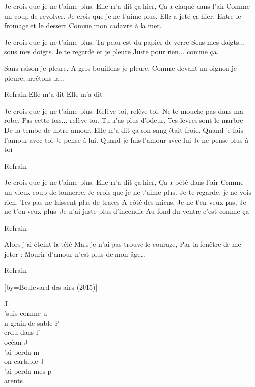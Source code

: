 \beginverse
Je crois que je ne t'aime plus.
Elle m'a dit ça hier,
Ça a claqué dans l'air
Comme un coup de revolver.
Je crois que je ne t'aime plus.
Elle a jeté ça hier,
Entre le fromage et le dessert
Comme mon cadavre à la mer.
\endverse

\beginverse
Je crois que je ne t'aime plus.
Ta peau est du papier de verre
Sous mes doigts... sous mes doigts.
Je te regarde et je pleure
Juste pour rien... comme ça.
\endverse

\beginverse
Sans raison je pleure,
A gros bouillons je pleure,
Comme devant un oignon je pleure, arrêtons là...
\endverse

\beginverse
Refrain
Elle m'a dit
Elle m'a dit
\endverse

\beginverse
Je crois que je ne t'aime plus.
Relève-toi, relève-toi.
Ne te mouche pas dans ma robe,
Pas cette fois... relève-toi.
Tu n'as plus d'odeur,
Tes lèvres sont le marbre
De la tombe de notre amour,
Elle m'a dit ça son sang était froid.
Quand je fais l'amour avec toi
Je pense à lui.
Quand je fais l'amour avec lui
Je ne pense plus à toi
\endverse

\beginverse
Refrain
\endverse

\beginverse
Je crois que je ne t'aime plus.
Elle m'a dit ça hier,
Ça a pété dans l'air
Comme un vieux coup de tonnerre.
Je crois que je ne t'aime plus.
Je te regarde, je ne vois rien.
Tes pas ne laissent plus de traces
A côté des miens.
Je ne t'en veux pas,
Je ne t'en veux plus,
Je n'ai juste plus d'incendie
Au fond du ventre c'est comme ça
\endverse

\beginverse
Refrain \\[bis]
\endverse

\beginverse
Alors j'ai éteint la télé
Mais je n'ai pas trouvé le courage,
Par la fenêtre de me jeter :
Mourir d'amour n'est plus de mon âge...
\endverse

\beginverse
Refrain
\endverse

[by={Boulevard des airs (2015)}]

\beginverse
J\\[Lam]’suis comme u\\[Sol]n grain de sable
P\\[Lam]erdu dans l’\\[Sol]océan
J\\[Lam]’ai perdu m\\[Sol]on cartable
J\\[Do]’ai perdu mes p\\[Sol]arents
\endverse


